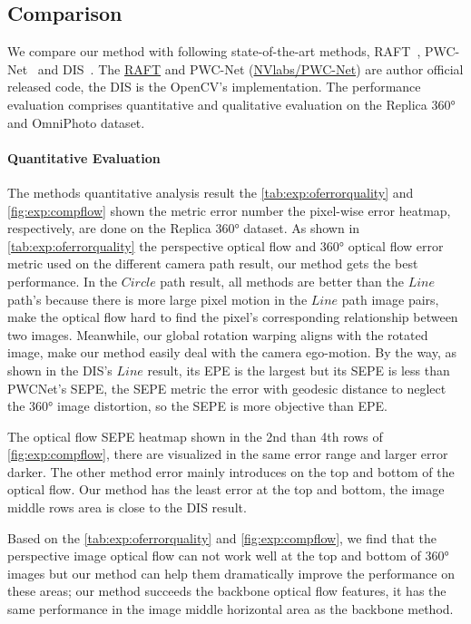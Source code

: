 \subsection{Comparison}

We compare our method with following state-of-the-art methods, RAFT~\cite{TeedD2020a}, PWC-Net~\cite{SunYLK2018} and DIS~\cite{KroegTDV2016}. 
%
The \href{https://github.com/princeton-vl/RAFT}{RAFT} and PWC-Net (\href{https://github.com/NVlabs/PWC-Net}{NVlabs/PWC-Net}) are author official released code, the DIS is the OpenCV's implementation. 
% 
The performance evaluation comprises quantitative and qualitative evaluation on the Replica 360° and OmniPhoto dataset.


\paragraph{Quantitative Evaluation}

The methods quantitative analysis result the \cref{tab:exp:oferrorquality} and \cref{fig:exp:compflow} shown the metric error number the pixel-wise error heatmap, respectively, are done on the Replica 360° dataset. 
As shown in \cref{tab:exp:oferrorquality} the perspective optical flow and 360° optical flow error metric used on the different camera path result, our method gets the best performance.
%
In the $Circle$ path result, all methods are better than the $Line$ path's because there is more large pixel motion in the $Line$ path image pairs, make the optical flow hard to find the pixel's corresponding relationship between two images. Meanwhile, our global rotation warping aligns with the rotated image, make our method easily deal with the camera ego-motion.
By the way, as shown in the DIS's $Line$ result, its EPE is the largest but its SEPE is less than PWCNet's SEPE, 
the SEPE metric the error with geodesic distance to neglect the 360° image distortion, so the SEPE is more objective than EPE.

The optical flow SEPE heatmap shown in the 2nd than 4th rows of \cref{fig:exp:compflow}, there are visualized in the same error range and larger error darker.
The other method error mainly introduces on the top and bottom of the optical flow.
Our method has the least error at the top and bottom, the image middle rows area is close to the DIS result. 

Based on the \cref{tab:exp:oferrorquality} and \cref{fig:exp:compflow}, we find that 
%
the perspective image optical flow can not work well at the top and bottom of 360° images but our method can help them dramatically improve the performance on these areas;
%
our method succeeds the backbone optical flow features, it has the same performance in the image middle horizontal area as the backbone method.



